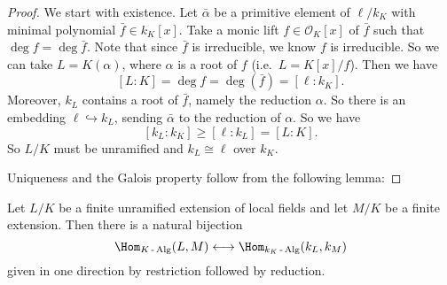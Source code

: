 \documentclass[a4paper]{article}
\begin{document}
\begin{proof}
  We start with existence. Let $\bar{\alpha}$ be a primitive element of $\ell/k_K$ with minimal polynomial $\bar{f} \in k_K[x]$. Take a monic lift $f \in \mathcal{O}_K[x]$ of $\bar{f}$ such that $\deg f = \deg \bar{f}$. Note that since $\bar{f}$ is irreducible, we know $f$ is irreducible. So we can take $L = K(\alpha)$, where $\alpha$ is a root of $f$ (i.e.\ $L = K[x]/f$). Then we have
  \[
    [L:K] = \deg f = \deg(\bar{f}) = [\ell:k_K].
  \]
  Moreover, $k_L$ contains a root of $\bar{f}$, namely the reduction $\alpha$. So there is an embedding $\ell \hookrightarrow k_L$, sending $\bar{\alpha}$ to the reduction of $\alpha$. So we have
  \[
    [k_L:k_K] \geq [\ell:k_L] = [L:K].
  \]
  So $L/K$ must be unramified and $k_L \cong \ell$ over $k_K$.

  Uniqueness and the Galois property follow from the following lemma:
\end{proof}

\begin{lemma}
  Let $L/K$ be a finite unramified extension of local fields and let $M/K$ be a finite extension. Then there is a natural bijection
  \[
    \Hom_{K\operatorname{-}\mathrm{Alg}}(L, M) \longleftrightarrow \Hom_{k_K\operatorname{-}\mathrm{Alg}} (k_L, k_M)
  \]
  given in one direction by restriction followed by reduction.
\end{lemma}
\end{document}
